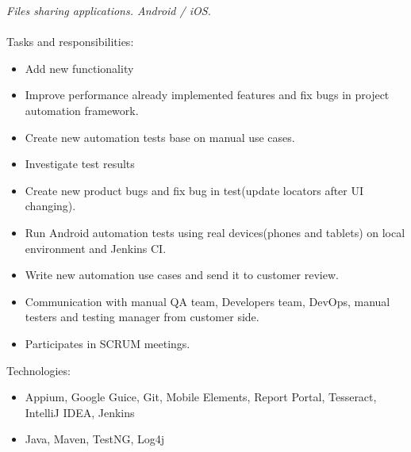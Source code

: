 \documentclass[margin, 10pt]{Stylesheet}
\begin{document}
\begin{resume}
\emph{Files sharing applications. Android / iOS.} \\ \\
Tasks and responsibilities:
\begin{itemize} \itemsep -2pt
	\item Add new functionality
	\item Improve performance already implemented features and fix bugs in project automation framework.
	\item Create new automation tests base on manual use cases.
	\item Investigate test results
	\item Create new product bugs and fix bug in test(update locators after UI changing).
	\item Run Android automation tests using real devices(phones and tablets) on local environment and Jenkins CI.
	\item Write new automation use cases and send it to customer review.
	\item Communication with manual QA team, Developers team, DevOps, manual testers and testing manager from customer side.
	\item Participates in SCRUM meetings. 
\end{itemize}
Technologies:
\begin{itemize} \itemsep -2pt
	\item Appium, Google Guice, Git, Mobile Elements, Report Portal, Tesseract, IntelliJ IDEA, Jenkins
	\item Java, Maven, TestNG, Log4j
\end{itemize}


\end{resume}
\end{document}
